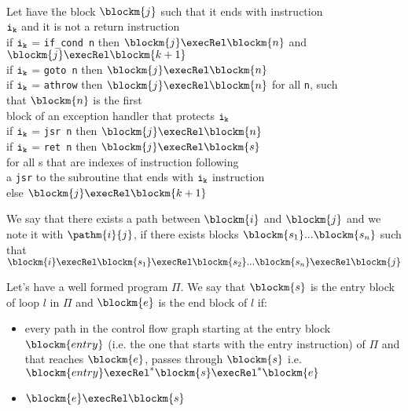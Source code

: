 \begin{defn}\label{execRel}
\begin{tabbing}
\\Let \=  have \= the block $\blockm{j}$ such that  it ends with instruction \\ 
$\tt{i_{k}}$ and it is not a return instruction\\
\>  if $\tt{i_{k}}$ = \texttt{if\_cond n} then   $\blockm{j} \execRel \blockm{n}$ and $\blockm{j} \execRel  \blockm{k+1} $ \\
\>  if $\tt{i_{k}}$ = \texttt{goto n} then $\blockm{j} \execRel \blockm{n}$ \\
\>  if $\tt{i_{k}}$ = \texttt{athrow} then $\blockm{j} \execRel \blockm{n}$ for all \texttt{n}, such \\
\> \> that $\blockm{n}$ is the first\\
\> \> block of an exception handler that protects $\tt{i_{k}}$ \\
\>  if $\tt{i_{k}}$ = \texttt{jsr n} then $\blockm{j} \execRel \blockm{n}$ \\
\>  if  $\tt{i_{k}}$ = \texttt{ret n} then  $ \blockm{j} \execRel \blockm{s}$\\
\> \> for all s that are indexes of instruction following \\
\> \> a \texttt{jsr} to the subroutine that ends with $\tt{i_{k}}$ instruction\\
\>  else $\blockm{j}  \execRel   \blockm{k+1}$
\end{tabbing}
\end{defn}

We say that there exists a path between $\blockm{i}$ and $\blockm{j}$ and we note it with  $\pathm{i}{j}$, if there exists blocks 
$\blockm{s_{1}}... \blockm{s_{n}}$ such that $\blockm{i} \execRel \blockm{s_{1}} \execRel \blockm{s_{2}}... \blockm{s_{n}} \execRel  \blockm{j}$
\begin{defn}
\label{defLoop}
Let's have a well formed program $\Pi$. We say that $\blockm{s}$ is the entry block of loop $l$ in $\Pi$ and $\blockm{e}$ is the end block of $l$ if:
\begin{itemize}
\item every path in the control flow graph starting at the entry block $\blockm{entry}$ (i.e. the one
 that starts with the entry instruction) of $\Pi$ and that reaches $\blockm{e}$, passes through  $\blockm{s}$ 
  i.e.$ \blockm{entry} \execRel^{*}  \blockm{s} \execRel^{*} \blockm{e}$
\item $\blockm{e} \execRel \blockm{s}$
\end{itemize}
\end{defn}



